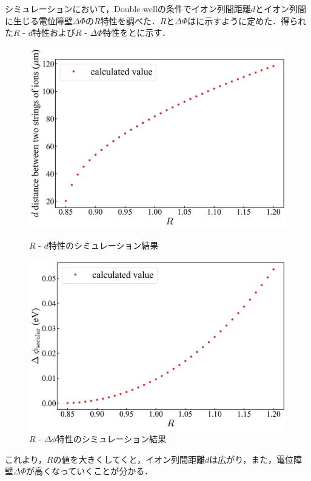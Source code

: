 シミュレーションにおいて，Double-wellの条件でイオン列間距離$d$とイオン列間に生じる電位障壁$\Delta \Phi$の$R$特性を調べた．$R$と$\Delta \Phi$はに示すように定めた．得られた$R$ - $d$特性および$R$ - $\Delta \Phi$特性をとに示す．

\begin{figure}[h]
	\begin{minipage}{0.5\linewidth}
		\begin{center}
			\includegraphics[width = 0.98\columnwidth]{./simulation/figure/Calc_R_d.jpg}
			\caption{$R$ - $d$特性のシミュレーション結果}
			\label{fig:calc_R-d}
		\end{center}
	\end{minipage}
	\begin{minipage}{0.5\linewidth}
		\begin{center}
			\includegraphics[width = 0.98\columnwidth]{./simulation/figure/Calc_R_phi.jpg}
			\caption{$R$ - $\Delta \phi$特性のシミュレーション結果}
			\label{fig:calc_R-phi}
		\end{center}
	\end{minipage}
\end{figure}
これより，$R$の値を大きくしてくと，イオン列間距離$d$は広がり，また，電位障壁$\Delta \Phi$が高くなっていくことが分かる．

